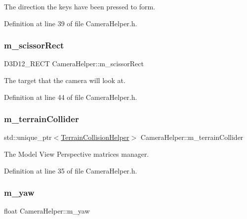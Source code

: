 The direction the keys have been pressed to form. 



Definition at line 39 of file Camera\+Helper.\+h.

\mbox{\label{class_camera_helper_add052fea87500f1d3b2732ec46c3ae85}} 
\subsubsection{\texorpdfstring{m\+\_\+scissor\+Rect}{m\_scissorRect}}
{\footnotesize\ttfamily D3\+D12\+\_\+\+R\+E\+CT Camera\+Helper\+::m\+\_\+scissor\+Rect\hspace{0.3cm}{\ttfamily [private]}}



The target that the camera will look at. 



Definition at line 44 of file Camera\+Helper.\+h.

\mbox{\label{class_camera_helper_a5ce949723d775603a605ffcd9cc68bbc}} 
\subsubsection{\texorpdfstring{m\+\_\+terrain\+Collider}{m\_terrainCollider}}
{\footnotesize\ttfamily std\+::unique\+\_\+ptr$<$\mbox{\hyperlink{class_terrain_collision_helper}{Terrain\+Collision\+Helper}}$>$ Camera\+Helper\+::m\+\_\+terrain\+Collider\hspace{0.3cm}{\ttfamily [private]}}



The Model View Perspective matrices manager. 



Definition at line 35 of file Camera\+Helper.\+h.

\mbox{\label{class_camera_helper_a9bdda4839839b4329188fc44517e8b01}} 
\subsubsection{\texorpdfstring{m\+\_\+yaw}{m\_yaw}}
{\footnotesize\ttfamily float Camera\+Helper\+::m\+\_\+yaw\hspace{0.3cm}{\ttfamily [private]}}



